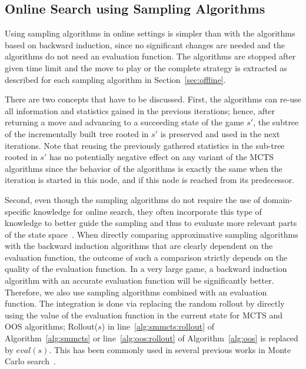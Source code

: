 \subsection{Online Search using Sampling Algorithms}


Using sampling algorithms in online settings is simpler than with the algorithms based on backward induction, since no significant changes are needed and the algorithms do not need an evaluation function.
The algorithms are stopped after given time limit and the move to play or the complete strategy is extracted as described for each sampling algorithm in Section~\ref{sec:offline}.

There are two concepts that have to be discussed.
First, the algorithms can re-use all information and statistics gained in the previous iterations; hence, after returning a move and advancing to a succeeding state of the game $s'$, the subtree of the incrementally built tree rooted in $s'$ is preserved and used in the next iterations.
Note that reusing the previously gathered statistics in the sub-tree rooted in $s'$ has no potentially negative effect on any variant of the MCTS algorithms since the behavior of the algorithms is exactly the same when the iteration is started in this node, and if this node is reached from its predecessor. 

Second, even though the sampling algorithms do not require the use of domain-specific knowledge for online search, they often incorporate this type of knowledge to better guide the sampling and thus to evaluate more relevant parts of the state space~\cite{Gelly07Combining,Lorentz08Amazons,Winands10MCTS-LOA,Lorentz13Breakthrough,Lanctot14Implicit}. When directly comparing approximative sampling algorithms with the backward induction algorithms that are clearly dependent on the evaluation function, the outcome of such a comparison strictly depends on the quality of the evaluation function. In a very large game, a backward induction algorithm with an accurate evaluation function will be significantly better. %
Therefore, we also use sampling algorithms combined with an evaluation function. The integration is done via replacing the random rollout
by directly using the value of the evaluation function in the current state for MCTS and OOS algorithms; \ie Rollout($s$) in
line~\ref{alg:smmcts:rollout} of Algorithm~\ref{alg:smmcts} or line~\ref{alg:oos:rollout} of Algorithm~\ref{alg:oos} is replaced by $eval(s)$.
This has been commonly used in several previous works in Monte Carlo search~\cite{Lorentz08Amazons,Lorentz13Breakthrough,Lanctot14Implicit,RamanujanS11,Lanctot13MCMS}.


